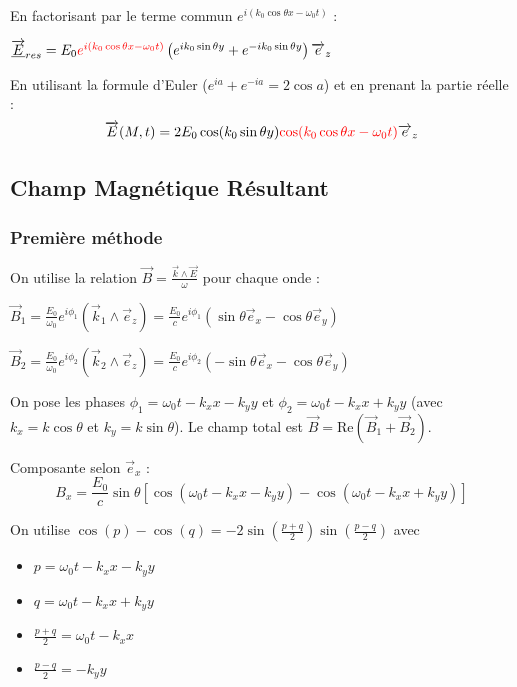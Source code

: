 \documentclass[french]{yLectureNote}
\renewcommand{\vec}{\overrightarrow}
\begin{document}
En factorisant par le terme commun $e^{i(k_0 \cos\theta x - \omega_0 t)}$ :

$\underline{\vec{E}}_{res} = E_0 {\color{red}e^{i(k_0 \cos\theta x - \omega_0 t)}} \left( e^{ik_0 \sin\theta y} + e^{-ik_0 \sin\theta y} \right) \vec{e}_z$

En utilisant la formule d'Euler ($e^{ia} + e^{-ia} = 2\cos a$) et en prenant la partie réelle :
$$\vec{E}(M,t) = 2E_0 \cos(k_0 \sin\theta y)  {\color{red}\cos(k_0 \cos\theta x - \omega_0 t)} \vec{e}_z$$

\subsection{Champ Magnétique Résultant}
\subsubsection{Première méthode}
On utilise la relation $\vec{B} = \frac{\vec{k} \wedge \vec{E}}{\omega}$ pour chaque onde :

$\vec{B}_1 = \frac{E_0}{\omega_0} e^{i \phi_1} (\vec{k}_1 \wedge \vec{e}_z) = \frac{E_0}{c} e^{i \phi_1} (\sin\theta \vec{e}_x - \cos\theta \vec{e}_y)$

$\vec{B}_2 = \frac{E_0}{\omega_0} e^{i \phi_2} (\vec{k}_2 \wedge \vec{e}_z) = \frac{E_0}{c} e^{i \phi_2} (-\sin\theta \vec{e}_x - \cos\theta \vec{e}_y)$



On pose les phases $\phi_1 = \omega_0 t - k_x x - k_y y$ et $\phi_2 = \omega_0 t - k_x x + k_y y$ (avec $k_x = k\cos\theta$ et $k_y = k\sin\theta$).
Le champ total est $\vec{B} = \text{Re}(\vec{B}_1 + \vec{B}_2)$.

Composante selon $\vec{e}_x$ :
$$B_x = \frac{E_0}{c} \sin\theta \left[ \cos(\omega_0 t - k_x x - k_y y) - \cos(\omega_0 t - k_x x + k_y y) \right]$$

On utilise  $\cos(p) - \cos(q) = -2\sin(\frac{p+q}{2})\sin(\frac{p-q}{2})$ avec
\begin{itemize}
    \item $p = \omega_0 t - k_x x - k_y y$
    \item $q = \omega_0 t - k_x x + k_y y$
\item $\frac{p+q}{2} = \omega_0 t - k_x x$
\item $\frac{p-q}{2} = -k_y y$
\end{itemize}
\end{document}
